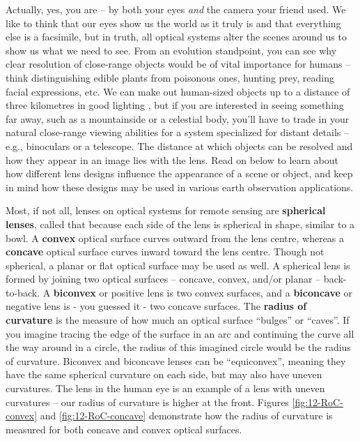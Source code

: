 \documentclass[
]{book}
\begin{document}
Actually, yes, you are -- by both your eyes \emph{and} the camera your friend used. We like to think that our eyes show us the world as it truly is and that everything else is a facsimile, but in truth, all optical systems alter the scenes around us to show us what we need to see. From an evolution standpoint, you can see why clear resolution of close-range objects would be of vital importance for humans -- think distinguishing edible plants from poisonous ones, hunting prey, reading facial expressions, etc. We can make out human-sized objects up to a distance of three kilometres in good lighting \citep{wolchover_how_2012}, but if you are interested in seeing something far away, such as a mountainside or a celestial body, you'll have to trade in your natural close-range viewing abilities for a system specialized for distant details -- e.g., binoculars or a telescope. The distance at which objects can be resolved and how they appear in an image lies with the lens. Read on below to learn about how different lens designs influence the appearance of a scene or object, and keep in mind how these designs may be used in various earth observation applications.

Most, if not all, lenses on optical systems for remote sensing are \textbf{spherical lenses}, called that because each side of the lens is spherical in shape, similar to a bowl. A \textbf{convex} optical surface curves outward from the lens centre, whereas a \textbf{concave} optical surface curves inward toward the lens centre. Though not spherical, a planar or flat optical surface may be used as well. A spherical lens is formed by joining two optical surfaces -- concave, convex, and/or planar -- back-to-back. A \textbf{biconvex} or positive lens is two convex surfaces, and a \textbf{biconcave} or negative lens is - you guessed it - two concave surfaces. The \textbf{radius of curvature} is the measure of how much an optical surface ``bulges'' or ``caves''. If you imagine tracing the edge of the surface in an arc and continuing the curve all the way around in a circle, the radius of this imagined circle would be the radius of curvature. Biconvex and biconcave lenses can be ``equiconvex'', meaning they have the same spherical curvature on each side, but may also have uneven curvatures. The lens in the human eye is an example of a lens with uneven curvatures -- our radius of curvature is higher at the front. Figures \ref{fig:12-RoC-convex} and \ref{fig:12-RoC-concave} demonstrate how the radius of curvature is measured for both concave and convex optical surfaces.
\end{document}
